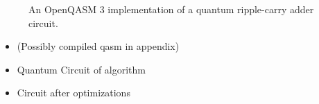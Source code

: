 \begin{figure}[htp]
    \centering     
    
    \caption{An OpenQASM 3 implementation of a quantum ripple-carry adder circuit.}
    \label{fig:eval_adder_qasm}
\end{figure}



\begin{itemize}
    \item (Possibly compiled qasm in appendix)
    \item Quantum Circuit of algorithm  
\end{itemize}


\begin{itemize}
    \item Circuit after optimizations
\end{itemize}